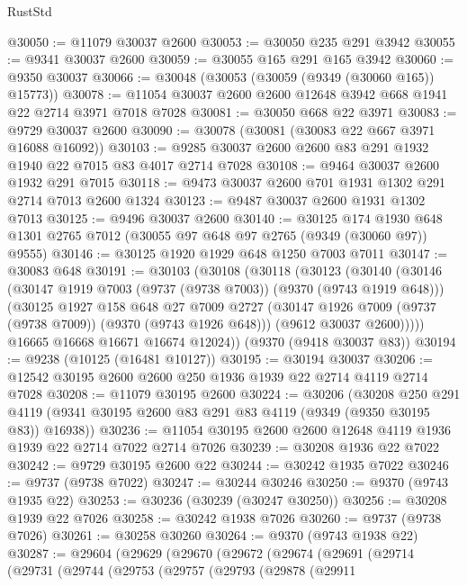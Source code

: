 \begin{lexlean}{RustStd}
\begin{coremodule}
{\begin{coremodule}
{{{{{{{{{{{{{{{{{{{{{{{{{{{{{{{{{{{{{{{@30050 := @11079 @30037 @2600
@30053 := @30050 @235 @291 @3942
@30055 := @9341 @30037 @2600
@30059 := @30055 @165 @291 @165 @3942
@30060 := @9350 @30037
@30066 := @30048 (@30053 (@30059 (@9349 (@30060 @165)) @15773))
@30078 := @11054 @30037 @2600 @2600 @12648 @3942 @668 @1941 @22 @2714 @3971 @7018 @7028
@30081 := @30050 @668 @22 @3971
@30083 := @9729 @30037 @2600
@30090 := @30078 (@30081 (@30083 @22 @667 @3971 @16088 @16092))
@30103 := @9285 @30037 @2600 @2600 @83 @291 @1932 @1940 @22 @7015 @83 @4017 @2714 @7028
@30108 := @9464 @30037 @2600 @1932 @291 @7015
@30118 := @9473 @30037 @2600 @701 @1931 @1302 @291 @2714 @7013 @2600 @1324
@30123 := @9487 @30037 @2600 @1931 @1302 @7013
@30125 := @9496 @30037 @2600
@30140 := @30125
    @174
    @1930
    @648
    @1301
    @2765
    @7012
    (@30055 @97 @648 @97 @2765 (@9349 (@30060 @97)) @9555)
@30146 := @30125 @1920 @1929 @648 @1250 @7003 @7011
@30147 := @30083 @648
@30191 := @30103
    (@30108
      (@30118
        (@30123
          (@30140
            (@30146
              (@30147 @1919 @7003 (@9737 (@9738 @7003)) (@9370 (@9743 @1919 @648)))
              (@30125
                @1927
                @158
                @648
                @27
                @7009
                @2727
                (@30147 @1926 @7009 (@9737 (@9738 @7009)) (@9370 (@9743 @1926 @648)))
                (@9612 @30037 @2600)))))
        @16665
        @16668
        @16671
        @16674
        @12024))
    (@9370 (@9418 @30037 @83))
@30194 := @9238 (@10125 (@16481 @10127))
@30195 := @30194 @30037
@30206 := @12542 @30195 @2600 @2600 @250 @1936 @1939 @22 @2714 @4119 @2714 @7028
@30208 := @11079 @30195 @2600
@30224 := @30206
    (@30208
      @250
      @291
      @4119
      (@9341 @30195 @2600 @83 @291 @83 @4119 (@9349 (@9350 @30195 @83)) @16938))
@30236 := @11054 @30195 @2600 @2600 @12648 @4119 @1936 @1939 @22 @2714 @7022 @2714 @7026
@30239 := @30208 @1936 @22 @7022
@30242 := @9729 @30195 @2600 @22
@30244 := @30242 @1935 @7022
@30246 := @9737 (@9738 @7022)
@30247 := @30244 @30246
@30250 := @9370 (@9743 @1935 @22)
@30253 := @30236 (@30239 (@30247 @30250))
@30256 := @30208 @1939 @22 @7026
@30258 := @30242 @1938 @7026
@30260 := @9737 (@9738 @7026)
@30261 := @30258 @30260
@30264 := @9370 (@9743 @1938 @22)
@30287 := @29604
    (@29629
      (@29670
        (@29672
          (@29674
            (@29691
              (@29714
                (@29731
                  (@29744
                    (@29753
                      (@29757
                        (@29793
                          (@29878
                            (@29911
}}}}}}}}}}}}}}}}}}}}}}}}}}}}}}}}}}}}}}}
\end{coremodule}}
\end{coremodule}
\end{lexlean}

